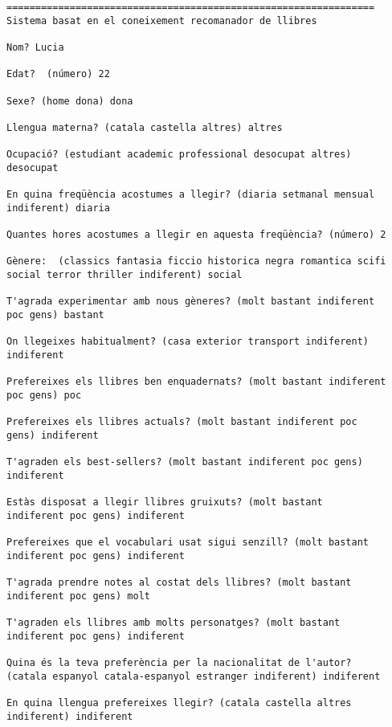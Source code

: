 \begin{verbatim}
================================================================
Sistema basat en el coneixement recomanador de llibres

Nom? Lucia

Edat?  (número) 22

Sexe? (home dona) dona

Llengua materna? (catala castella altres) altres

Ocupació? (estudiant academic professional desocupat altres)
desocupat

En quina freqüència acostumes a llegir? (diaria setmanal mensual
indiferent) diaria

Quantes hores acostumes a llegir en aquesta freqüència? (número) 2

Gènere:  (classics fantasia ficcio historica negra romantica scifi
social terror thriller indiferent) social

T'agrada experimentar amb nous gèneres? (molt bastant indiferent
poc gens) bastant

On llegeixes habitualment? (casa exterior transport indiferent)
indiferent

Prefereixes els llibres ben enquadernats? (molt bastant indiferent
poc gens) poc

Prefereixes els llibres actuals? (molt bastant indiferent poc
gens) indiferent

T'agraden els best-sellers? (molt bastant indiferent poc gens)
indiferent

Estàs disposat a llegir llibres gruixuts? (molt bastant
indiferent poc gens) indiferent

Prefereixes que el vocabulari usat sigui senzill? (molt bastant
indiferent poc gens) indiferent

T'agrada prendre notes al costat dels llibres? (molt bastant
indiferent poc gens) molt

T'agraden els llibres amb molts personatges? (molt bastant
indiferent poc gens) indiferent

Quina és la teva preferència per la nacionalitat de l'autor?
(catala espanyol catala-espanyol estranger indiferent) indiferent

En quina llengua prefereixes llegir? (catala castella altres
indiferent) indiferent


\end{verbatim}
